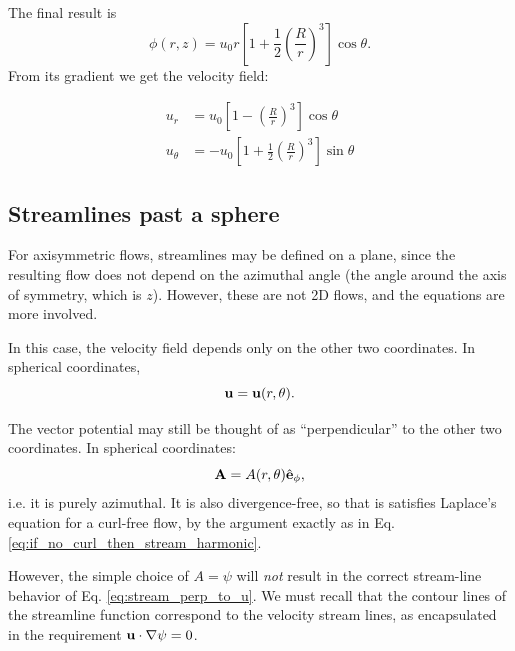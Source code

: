 The final result is
\[
  \phi(r,z) = u_0 r
  \left[
    1 +
    \frac12 \left( \frac{R}{r}\right)^3
  \right] \cos\theta .
\]
From its gradient we get the velocity field:

\begin{align*}
u_r &=  u_0
  \left[
    1 -
      \left(\frac{R}{r}\right)^3
  \right] \cos\theta \\
u_\theta &=  -u_0
  \left[
    1 + \frac12
      \left(\frac{R}{r}\right)^3
  \right] \sin\theta
\end{align*}


\subsection{Streamlines past a sphere}

For axisymmetric flows, streamlines may be defined on a plane, since
the resulting flow does not depend on the azimuthal angle (the angle
around the axis of symmetry, which is $z$). However, these are not 2D
flows, and the equations are more involved.

In this case, the velocity field depends only on the other two
coordinates. In spherical coordinates,
\[
  \mathbf{u} = \mathbf{u}(r,\theta) .
\]

The vector potential may still be thought of as ``perpendicular'' to the other
two coordinates. In spherical coordinates:
\[
  \mathbf{A} = A(r,\theta)  \hat{\mathbf{e}}_\phi ,
\]
i.e. it is purely azimuthal. It is also divergence-free, so that is
satisfies Laplace's equation for a curl-free flow, by the argument
exactly as in Eq. \ref{eq:if_no_curl_then_stream_harmonic}.

However, the simple choice of $A=\psi$ will \emph{not} result in the correct
stream-line behavior of Eq.  \ref{eq:stream_perp_to_u}. We must recall
that the contour lines of the streamline function correspond
to the velocity stream lines, as encapsulated in
the requirement $\mathbf{u}\cdot\nabla\psi =0$.


